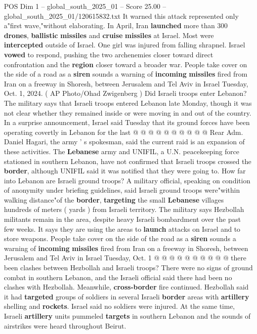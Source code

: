 \begin{textsample}{POS Dim 1 – global\_south\_2025\_01 – Score 25.00 – global\_south\_2025\_01/120615832.txt}
It warned this attack represented only a"first wave,"without elaborating.
In April, Iran \textbf{launched} more than 300 \textbf{drones}, \textbf{ballistic} \textbf{missiles} and \textbf{cruise} \textbf{missiles} at Israel.
Most were \textbf{intercepted} outside of Israel.
One girl was injured from falling shrapnel.
Israel \textbf{vowed} to respond, pushing the two archenemies closer toward direct confrontation and the \textbf{region} closer toward a broader war.
People take cover on the side of a road as a \textbf{siren} sounds a warning of \textbf{incoming} \textbf{missiles} fired from Iran on a freeway in Shoresh, between Jerusalem and Tel Aviv in Israel Tuesday, Oct. 1, 2024. ( AP Photo/Ohad Zwigenberg ) Did Israeli troops enter Lebanon?
The military says that Israeli troops entered Lebanon late Monday, though it was not clear whether they remained inside or were moving in and out of the country.
In a surprise announcement, Israel said Tuesday that its ground forces have been operating covertly in Lebanon for the last @ @ @ @ @ @ @ @ @ @ Rear Adm.
Daniel Hagari, the army ' s spokesman, said the current raid is an expansion of these activities.
The \textbf{Lebanese} army and UNIFIL, a U.N. peacekeeping force stationed in southern Lebanon, have not confirmed that Israeli troops crossed the \textbf{border}, although UNIFIL said it was notified that they were going to.
How far into Lebanon are Israeli ground troops?
A military official, speaking on condition of anonymity under briefing guidelines, said Israeli ground troops were"within walking distance"of the \textbf{border}, \textbf{targeting} the small \textbf{Lebanese} villages hundreds of meters ( yards ) from Israeli territory.
The military says Hezbollah militants remain in the area, despite heavy Israeli bombardment over the past few weeks.
It says they are using the areas to \textbf{launch} attacks on Israel and to store weapons.
People take cover on the side of the road as a \textbf{siren} sounds a warning of \textbf{incoming} \textbf{missiles} fired from Iran on a freeway in Shoresh, between Jerusalem and Tel Aviv in Israel Tuesday, Oct. 1 @ @ @ @ @ @ @ @ @ @ there been clashes between Hezbollah and Israeli troops?
There were no signs of ground combat in southern Lebanon, and the Israeli official said there had been no clashes with Hezbollah.
Meanwhile, \textbf{cross-border} fire continued.
Hezbollah said it had \textbf{targeted} groups of soldiers in several Israeli \textbf{border} areas with \textbf{artillery} shelling and \textbf{rockets}.
Israel said no soldiers were injured.
At the same time, Israeli \textbf{artillery} units pummeled \textbf{targets} in southern Lebanon and the sounds of airstrikes were heard throughout Beirut.

\end{textsample}
